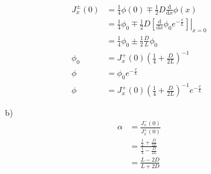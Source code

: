 \documentclass{article}
\begin{document}
\begin{itemize}
\begin{itemize}
\begin{align*}
            J^{\pm }_x(0)&=\frac{1}{4}\phi(0)\mp \frac{1}{2}D\frac{\text{d}}{\text{d}x}\phi(x)\\
            &=\frac{1}{4}\phi_0\mp\frac{1}{2}D\left.\left[\frac{\text{d}}{\text{d}x}\phi_0e^{-\frac{x}{L}}\right]\right|_{x=0}\\
            &=\frac{1}{4}\phi_0\pm\frac{1}{2}\frac{D}{L}\phi_0\\
            \phi_0&=J^+_x(0)\left(\frac{1}{4}+\frac{D}{2L}\right)^{-1}\\
            \phi&=\phi_0e^{-\frac{x}{L}}\\
            \phi&=J^+_x(0)\left(\frac{1}{4}+\frac{D}{2L}\right)^{-1}e^{-\frac{x}{L}}
        \end{align*}
        \item [b)]
        \begin{align*}
            \alpha &=\frac{J_x^-(0)}{J^+_x(0)}\\
            &=\frac{\frac{1}{4}+\frac{D}{2L}}{\frac{1}{4}-\frac{D}{2L}}\\
            &=\frac{L-2D}{L+2D}
        \end{align*}
    \end{itemize}
\end{itemize}
\end{document}
